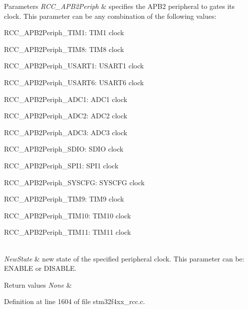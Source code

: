 \begin{DoxyParams}{Parameters}
{\em R\+C\+C\+\_\+\+A\+P\+B2\+Periph} & specifies the A\+P\+B2 peripheral to gates its clock. This parameter can be any combination of the following values\+: \begin{DoxyItemize}
\item R\+C\+C\+\_\+\+A\+P\+B2\+Periph\+\_\+\+T\+I\+M1\+: T\+I\+M1 clock \item R\+C\+C\+\_\+\+A\+P\+B2\+Periph\+\_\+\+T\+I\+M8\+: T\+I\+M8 clock \item R\+C\+C\+\_\+\+A\+P\+B2\+Periph\+\_\+\+U\+S\+A\+R\+T1\+: U\+S\+A\+R\+T1 clock \item R\+C\+C\+\_\+\+A\+P\+B2\+Periph\+\_\+\+U\+S\+A\+R\+T6\+: U\+S\+A\+R\+T6 clock \item R\+C\+C\+\_\+\+A\+P\+B2\+Periph\+\_\+\+A\+D\+C1\+: A\+D\+C1 clock \item R\+C\+C\+\_\+\+A\+P\+B2\+Periph\+\_\+\+A\+D\+C2\+: A\+D\+C2 clock \item R\+C\+C\+\_\+\+A\+P\+B2\+Periph\+\_\+\+A\+D\+C3\+: A\+D\+C3 clock \item R\+C\+C\+\_\+\+A\+P\+B2\+Periph\+\_\+\+S\+D\+IO\+: S\+D\+IO clock \item R\+C\+C\+\_\+\+A\+P\+B2\+Periph\+\_\+\+S\+P\+I1\+: S\+P\+I1 clock \item R\+C\+C\+\_\+\+A\+P\+B2\+Periph\+\_\+\+S\+Y\+S\+C\+FG\+: S\+Y\+S\+C\+FG clock \item R\+C\+C\+\_\+\+A\+P\+B2\+Periph\+\_\+\+T\+I\+M9\+: T\+I\+M9 clock \item R\+C\+C\+\_\+\+A\+P\+B2\+Periph\+\_\+\+T\+I\+M10\+: T\+I\+M10 clock \item R\+C\+C\+\_\+\+A\+P\+B2\+Periph\+\_\+\+T\+I\+M11\+: T\+I\+M11 clock \end{DoxyItemize}
\\
\hline
{\em New\+State} & new state of the specified peripheral clock. This parameter can be\+: E\+N\+A\+B\+LE or D\+I\+S\+A\+B\+LE. \\
\hline
\end{DoxyParams}

\begin{DoxyRetVals}{Return values}
{\em None} & \\
\hline
\end{DoxyRetVals}


Definition at line 1604 of file stm32f4xx\+\_\+rcc.\+c.

\mbox{\label{group___r_c_c_gad94553850ac07106a27ee85fec37efdf}} 
